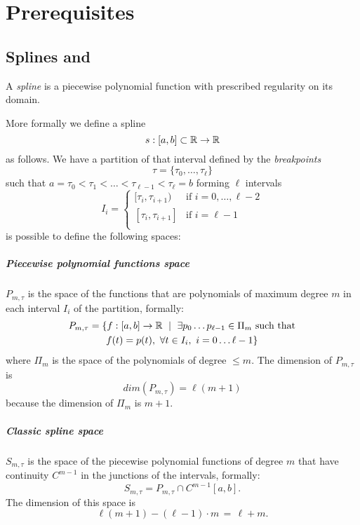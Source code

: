 \documentclass[dissertation.tex]{subfiles}
\begin{document}
\chapter{Prerequisites}\label{cha:prerequisites}
\section{Splines and \bss}\label{sec:spline}
A \emph{spline} is a piecewise polynomial function with prescribed
regularity on its domain.

More formally we define a spline \cite{deboor}\cite{farin}\cite{salomon}\cite{bartels}
$$s:[a,b]\subset\mathbb{R}\rightarrow\mathbb{R}$$
as follows.
We have a partition of that interval defined by the \emph{breakpoints}
$$\tau = \{\tau_0,\dots,\tau_\ell\}$$
such that $a=\tau_0<\tau_1<\dots<\tau_{\ell-1}<\tau_\ell=b$ forming $\ell$
intervals
$$
I_i=
\begin{cases}
  [\tau_i,\tau_{i+1}) & \mbox{if } i=0,\dots,\ell-2\\
    [\tau_i,\tau_{i+1}] & \mbox{if } i=\ell-1\\
\end{cases}
$$
is possible to define the following spaces:
\paragraph{Piecewise polynomial functions space} $P_{m,\tau}$
is the space of the functions that are polynomials of maximum degree $m$
in each interval $I_i$ of the partition, formally:
\begin{multline*}
  P_{m,\tau}=\{f:[a,b]\rightarrow\mathbb{R}\ \mid\ \exists p_0\dots
  p_{\ell-1}\in\Pi_m \ \text{such that}\\
  f(t)=p(t),\ \forall t\in I_i,\
  i=0\dots \ell-1\}
\end{multline*}
where $\Pi_m$ is the space of the polynomials of degree $\le m$. The
dimension of $P_{m,\tau}$ is
\begin{equation*}
  dim(P_{m,\tau})=\ell(m+1)
\end{equation*}
because the dimension of $\Pi_m$
is $m+1$.
\paragraph{Classic spline space} $S_{m,\tau}$ is the space of
the piecewise polynomial functions of degree $m$ that have continuity
$C^{m-1}$ in
the junctions of the intervals, formally:
$$
S_{m,\tau}=P_{m,\tau}\cap C^{m-1}[a,b].
$$
The dimension of this space is
\begin{equation}
  \label{eq:dimClassicSpline}
  \ell(m+1)-(\ell-1)\cdot m\,=\,\ell+m.
\end{equation}
\end{document}
